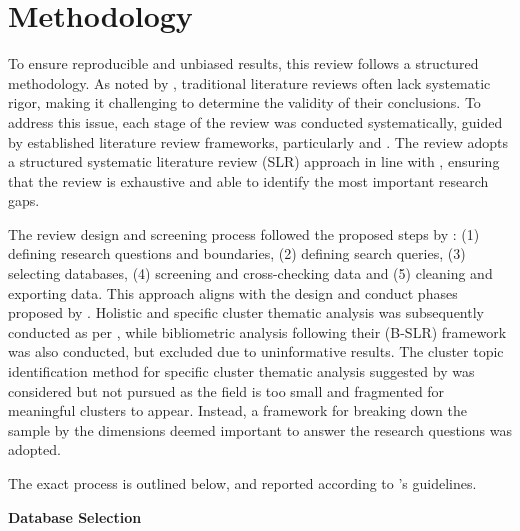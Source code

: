 \section{Methodology}
\label{sec:methodology}

To ensure reproducible and unbiased results, this review follows a structured methodology. As noted by \textcite{tranfield_et_al}, traditional literature reviews often lack systematic rigor, making it challenging to determine the validity of their conclusions. To address this issue, each stage of the review was conducted systematically, guided by established literature review frameworks, particularly \textcite{snyder_2019} and \textcite{marzi_et_al_2024}. The review adopts a structured systematic literature review (SLR) approach in line with \textcite{snyder_2019}, ensuring that the review is exhaustive and able to identify the most important research gaps. 

The review design and screening process followed the proposed steps by \textcite{marzi_et_al_2024}: (1) defining research questions and boundaries, (2) defining search queries, (3) selecting databases, (4) screening and cross-checking data and (5) cleaning and exporting data. This approach aligns with the design and conduct phases proposed by \textcite{snyder_2019}. Holistic and specific cluster thematic analysis was subsequently conducted as per \textcite{marzi_et_al_2024}, while bibliometric analysis following their (B-SLR) framework was also conducted, but excluded due to uninformative results. The cluster topic identification method for specific cluster thematic analysis suggested by \cite{marzi_et_al_2024} was considered but not pursued as the field is too small and fragmented for meaningful clusters to appear. Instead, a framework for breaking down the sample by the dimensions deemed important to answer the research questions was adopted. 

The exact process is outlined below, and reported according to \textcite{marzi_et_al_2024}'s guidelines.

\textbf{Database Selection}\nopagebreak

